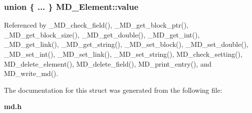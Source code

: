 \subsubsection{\setlength{\rightskip}{0pt plus 5cm}union \{ ... \}   \bf{MD\_\-Element::value}}\label{structMD__Element_d17591983c492ef322ed5237a3ecd79c}




Referenced by \_\-MD\_\-check\_\-field(), \_\-MD\_\-get\_\-block\_\-ptr(), \_\-MD\_\-get\_\-block\_\-size(), \_\-MD\_\-get\_\-double(), \_\-MD\_\-get\_\-int(), \_\-MD\_\-get\_\-link(), \_\-MD\_\-get\_\-string(), \_\-MD\_\-set\_\-block(), \_\-MD\_\-set\_\-double(), \_\-MD\_\-set\_\-int(), \_\-MD\_\-set\_\-link(), \_\-MD\_\-set\_\-string(), MD\_\-check\_\-setting(), MD\_\-delete\_\-element(), MD\_\-delete\_\-field(), MD\_\-print\_\-entry(), and MD\_\-write\_\-md().

The documentation for this struct was generated from the following file:\begin{CompactItemize}
\item 
\bf{md.h}\end{CompactItemize}
